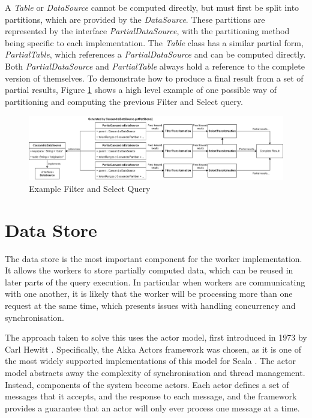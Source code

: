 A \textit{Table} or \textit{DataSource} cannot be computed directly, but must first be split into partitions, which are provided by the \textit{DataSource}. These partitions are represented by the interface \textit{PartialDataSource}, with the partitioning method being specific to each implementation. The \textit{Table} class has a similar partial form, \textit{PartialTable}, which references a \textit{PartialDataSource} and can be computed directly. Both \textit{PartialDataSource} and \textit{PartialTable} always hold a reference to the complete version of themselves. To demonstrate how to produce a final result from a set of partial results, Figure \ref{fig:partial-filter-select-query} shows a high level example of one possible way of partitioning and computing the previous Filter and Select query.

\begin{figure}[h]
	\centering
	\includegraphics[width=\textwidth]{chapters/diagrams/implementation/partial-filter-select-query}
	\caption{Example Filter and Select Query}
	\label{fig:partial-filter-select-query}
\end{figure}



\section{Data Store}
The data store is the most important component for the worker implementation. It allows the workers to store partially computed data, which can be reused in later parts of the query execution. In particular when workers are communicating with one another, it is likely that the worker will be processing more than one request at the same time, which presents issues with handling concurrency and synchronisation.

The approach taken to solve this uses the actor model, first introduced in 1973 by Carl Hewitt \cite{hewitt1973session}. Specifically, the Akka Actors framework was chosen, as it is one of the most widely supported implementations of this model for Scala . The actor model abstracts away the complexity of synchronisation and thread management. Instead, components of the system become actors. Each actor defines a set of messages that it accepts, and the response to each message, and the framework provides a guarantee that an actor will only ever process one message at a time.

